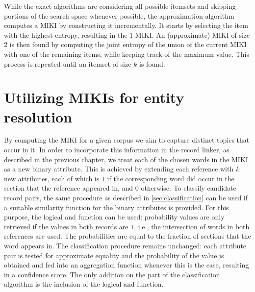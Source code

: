 While the exact algorithms are considering all possible itemsets and skipping portions of the search space whenever possible, the approximation algorithm computes a MIKI by constructing it incrementally.
It starts by selecting the item with the highest entropy, resulting in the $1$-MIKI.
An (approximate) MIKI of size $2$ is then found by computing the joint entropy of the union of the current MIKI with one of the remaining items, while keeping track of the maximum value.
This process is repeated until an itemset of size $k$ is found.




\section{Utilizing MIKIs for entity resolution}
\label{sec:miki_utilization}

By computing the MIKI for a given corpus we aim to capture distinct topics that occur in it.
In order to incorporate this information in the record linker, as described in the previous chapter, we treat each of the chosen words in the MIKI as a new binary attribute.
This is achieved by extending each reference with $k$ new attributes, each of which is $1$ if the corresponding word did occur in the section that the reference appeared in, and $0$ otherwise.
To classify candidate record pairs, the same procedure as described in \cref{sec:classification} can be used if a suitable similarity function for the binary attributes is provided.
For this purpose, the logical and function can be used: probability values are only retrieved if the values in both records are $1$, i.e., the intersection of words in both references are used.
The probabilities are equal to the fraction of sections that the word appears in.
The classification procedure remains unchanged: each attribute pair is tested for approximate equality and the probability of the value is obtained and fed into an aggregation function whenever this is the case, resulting in a confidence score.
The only addition on the part of the classification algorithm is the inclusion of the logical and function.